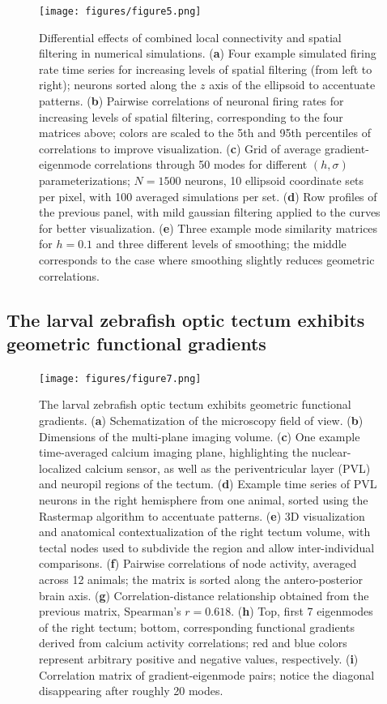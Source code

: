 \documentclass{article}
\begin{document}
\begin{figure}[t]
    \centering
    \texttt{[image: figures/figure5.png]}
    \caption{Differential effects of combined local connectivity and spatial filtering in numerical simulations. (\textbf{a}) Four example simulated firing rate time series for increasing levels of spatial filtering (from left to right); neurons sorted along the $z$ axis of the ellipsoid to accentuate patterns. (\textbf{b}) Pairwise correlations of neuronal firing rates for increasing levels of spatial filtering, corresponding to the four matrices above; colors are scaled to the 5th and 95th percentiles of correlations to improve visualization. (\textbf{c}) Grid of average gradient-eigenmode correlations through 50 modes for different $(h,\sigma)$ parameterizations; $N=1500$ neurons, 10 ellipsoid coordinate sets per pixel, with 100 averaged simulations per set. (\textbf{d}) Row profiles of the previous panel, with mild gaussian filtering applied to the curves for better visualization. (\textbf{e}) Three example mode similarity matrices for $h=0.1$ and three different levels of smoothing; the middle corresponds to the case where smoothing slightly reduces geometric correlations.}
    \label{fig5}
    \hrulefill
\end{figure}

\subsection*{The larval zebrafish optic tectum exhibits geometric functional gradients}

\begin{figure}[t]
    \centering
    \texttt{[image: figures/figure7.png]}
    \caption{The larval zebrafish optic tectum exhibits geometric functional gradients. (\textbf{a}) Schematization of the microscopy field of view. (\textbf{b}) Dimensions of the multi-plane imaging volume. (\textbf{c}) One example time-averaged calcium imaging plane, highlighting the nuclear-localized calcium sensor, as well as the periventricular layer (PVL) and neuropil regions of the tectum. (\textbf{d}) Example time series of PVL neurons in the right hemisphere from one animal, sorted using the Rastermap algorithm to accentuate patterns. (\textbf{e}) 3D visualization and anatomical contextualization of the right tectum volume, with tectal nodes used to subdivide the region and allow inter-individual comparisons. (\textbf{f}) Pairwise correlations of node activity, averaged across 12 animals; the matrix is sorted along the antero-posterior brain axis. (\textbf{g}) Correlation-distance relationship obtained from the previous matrix, Spearman's $r=0.618$. (\textbf{h}) Top, first 7 eigenmodes of the right tectum; bottom, corresponding functional gradients derived from calcium activity correlations; red and blue colors represent arbitrary positive and negative values, respectively. (\textbf{i}) Correlation matrix of gradient-eigenmode pairs; notice the diagonal disappearing after roughly 20 modes.}
    \label{fig6}
    \hrulefill
\end{figure}
\end{document}
